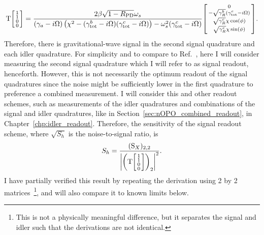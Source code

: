 \begin{equation}\label{eq:nIS_sigRO_signal_response}
\text{T}\begin{bsmallmatrix}1 \\1\\0\\0\end{bsmallmatrix} = \frac{2 \beta \sqrt{1-R_\text{PD}} \omega_s}{(\gamma_a-i \Omega ) \left(\chi ^2-(\gamma^b_\text{tot}-i\Omega) (\gamma^c_\text{tot}-i\Omega)\right)-\omega_s^2 (\gamma^c_\text{tot}-i \Omega )} \begin{bsmallmatrix}0 \\-\sqrt{\gamma^b_R}(\gamma^c_\text{tot}-i\Omega)\\\sqrt{\gamma^c_R}\chi\cos(\phi)\\\sqrt{\gamma^c_R}\chi\sin(\phi)\end{bsmallmatrix}.
\end{equation}
Therefore, there is gravitational-wave signal in the second signal quadrature and each idler quadrature. For simplicity and to compare to Ref.~\cite{Li2020}, here I will consider measuring the second signal quadrature which I will refer to as signal readout, henceforth. However, this is not necessarily the optimum readout of the signal quadratures since the noise might be sufficiently lower in the first quadrature to preference a combined measurement. I will consider this and other readout schemes, such as measurements of the idler quadratures and combinations of the signal and idler quadratures, like in Section~\ref{sec:nOPO_combined_readout}, in Chapter~\ref{chp:idler_readout}.
Therefore, the sensitivity of the signal readout scheme, where $\sqrt{S_h}$ is the noise-to-signal ratio, is
\begin{equation}\label{eq:nIS_sigRO_sens}
S_h = \frac{(\text{S}_X)_{2,2}}{\abs{\left(\text{T}\begin{bsmallmatrix}1 \\1\\0\\0\end{bsmallmatrix}\right)_2}^2}.
\end{equation}
 I have partially verified this result by repeating the derivation using 2 by 2 matrices~\footnote{This is not a physically meaningful difference, but it separates the signal and idler such that the derivations are not identical.}, and will also compare it to known limits below. %


